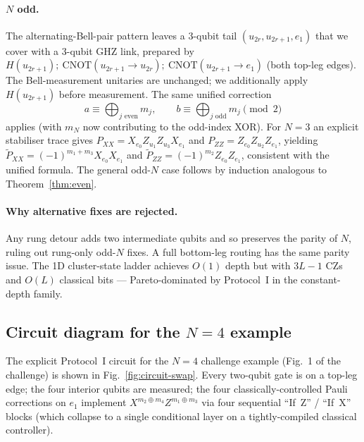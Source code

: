 \documentclass[11pt,a4paper]{article}
\theoremstyle{definition}
\newcommand{\CNOT}{\mathrm{CNOT}}
\newcommand{\CZ}{\mathrm{CZ}}
\begin{document}
\paragraph{$N$ odd.} The alternating-Bell-pair pattern leaves a
3-qubit tail $(u_{2r},u_{2r+1},e_1)$ that we cover with a 3-qubit GHZ
link, prepared by $H(u_{2r+1});\ \CNOT(u_{2r+1}\to u_{2r});\ \CNOT(u_{2r+1}\to e_1)$
(both top-leg edges). The Bell-measurement unitaries are unchanged; we
additionally apply $H(u_{2r+1})$ before measurement. The same unified
correction
\begin{equation}
  a \equiv \bigoplus_{j\text{ even}} m_j, \qquad
  b \equiv \bigoplus_{j\text{ odd}} m_j
  \pmod 2
\end{equation}
applies (with $m_N$ now contributing to the odd-index XOR). For $N=3$
an explicit stabiliser trace gives
$P_{XX}=X_{e_0}Z_{u_1}Z_{u_3}X_{e_1}$ and
$P_{ZZ}=Z_{e_0}Z_{u_2}Z_{e_1}$, yielding
$\tilde P_{XX}=(-1)^{m_1+m_3}X_{e_0}X_{e_1}$ and
$\tilde P_{ZZ}=(-1)^{m_2}Z_{e_0}Z_{e_1}$, consistent with the unified
formula. The general odd-$N$ case follows by induction analogous to
Theorem~\ref{thm:even}.

\paragraph{Why alternative fixes are rejected.} Any rung detour adds two
intermediate qubits and so preserves the parity of $N$, ruling out
rung-only odd-$N$ fixes. A full bottom-leg routing has the same parity
issue. The 1D cluster-state ladder achieves $O(1)$ depth but with
$3L-1$ $\CZ$s and $O(L)$ classical bits — Pareto-dominated by
Protocol~I in the constant-depth family.

\subsection{Circuit diagram for the $N=4$ example}

The explicit Protocol~I circuit for the $N=4$ challenge example
(Fig.~1 of the challenge) is shown in Fig.~\ref{fig:circuit-swap}.
Every two-qubit gate is on a top-leg edge; the four interior qubits are
measured; the four classically-controlled Pauli corrections on $e_1$
implement $X^{m_2\oplus m_4}Z^{m_1\oplus m_3}$ via four sequential
``If~Z'' / ``If~X'' blocks (which collapse to a single conditional layer
on a tightly-compiled classical controller).
\end{document}
